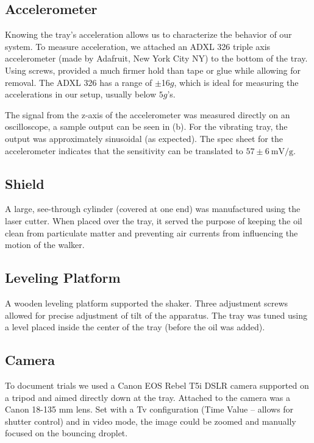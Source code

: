 \subsection{Accelerometer}  
    Knowing the tray's acceleration allows us to characterize the behavior of our system. To measure acceleration, we attached an ADXL 326 triple axis accelerometer (made by Adafruit, New York City NY) to the bottom of the tray. Using screws, provided a much firmer hold than tape or glue while allowing for removal. The ADXL 326 has a range of $\pm$16$g$, which is ideal for measuring the accelerations in our setup, usually below $5g$'s. 
      
      The signal from the z-axis of the accelerometer was measured directly on an oscilloscope, a sample output can be seen in (b). For the vibrating tray, the output was approximately sinusoidal (as expected). The spec sheet for the accelerometer indicates that the sensitivity can be translated to $57 \pm 6~\mathrm{mV/g}$. 
    
\subsection{Shield}
    A large, see-through cylinder (covered at one end) was manufactured using the laser cutter. When placed over the tray, it served the purpose of keeping the oil clean from particulate matter and preventing air currents from influencing the motion of the walker.       
   
\subsection{Leveling Platform}
    A wooden leveling platform supported the shaker. Three adjustment screws allowed for precise adjustment of tilt of the apparatus. The tray was tuned using a level placed inside the center of the tray (before the oil was added). 

\subsection{Camera}       
 
To document trials we used a Canon EOS Rebel T5i DSLR camera supported on a tripod and aimed directly down at the tray. Attached to the camera was a Canon 18-135 mm lens. Set with a Tv  configuration (Time Value -- allows for shutter control) and in video mode, the image could be zoomed and manually focused on the bouncing droplet. 

